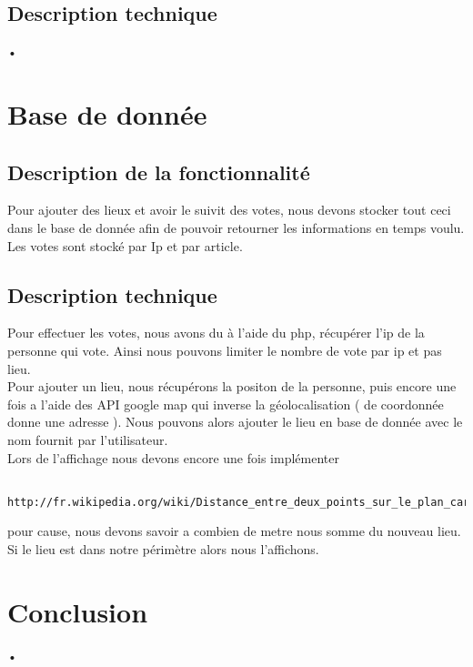 \documentclass[10pt,a4paper]{report}
\begin{document}
\subsection{Description technique}
\begin{flushleft}
•
\end{flushleft}


\section{Base de donnée}

\subsection{Description de la fonctionnalité}
\begin{flushleft}
Pour ajouter des lieux et avoir le suivit des votes, nous devons stocker tout ceci dans le base de donnée afin de pouvoir retourner les informations en temps voulu. \\

Les votes sont stocké par Ip et par article. \\
\end{flushleft}

\subsection{Description technique}
\begin{flushleft}
Pour effectuer les votes, nous avons du à l'aide du php, récupérer l'ip de la personne qui vote. Ainsi nous pouvons limiter le nombre de vote par ip et pas lieu. \\

Pour ajouter un lieu, nous récupérons la positon de la personne, puis encore une fois a l'aide des API google map qui inverse la géolocalisation ( de coordonnée donne une adresse ). Nous pouvons alors ajouter le lieu en base de donnée avec le nom fournit par l'utilisateur. \\

Lors de l'affichage nous devons encore une fois implémenter 
\begin{verbatim}
	http://fr.wikipedia.org/wiki/Distance_entre_deux_points_sur_le_plan_cart%C3%A9sien
\end{verbatim} 
pour cause, nous devons savoir a combien de metre nous somme du nouveau lieu.
Si le lieu est dans  notre périmètre alors nous l'affichons.\\
\end{flushleft}



\section{Conclusion}
\begin{flushleft}
•
\end{flushleft}
\end{document}
